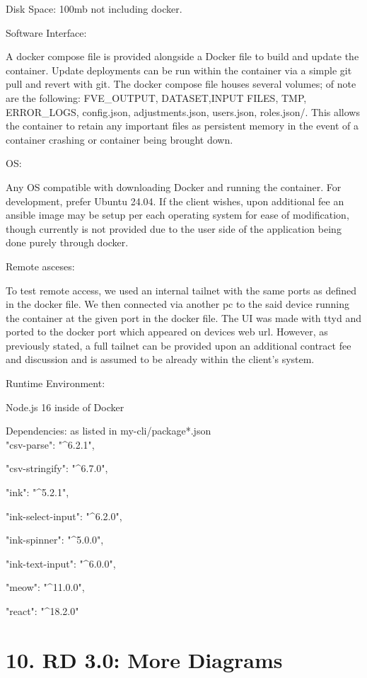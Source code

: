 \documentclass[
]{article}
\begin{document}
Disk Space: 100mb not including docker.

Software Interface:

A docker compose file is provided alongside a Docker file to build and
update the container. Update deployments can be run within the container
via a simple git pull and revert with git. The docker compose file
houses several volumes; of note are the following: FVE\_OUTPUT,
DATASET,INPUT FILES, TMP, ERROR\_LOGS, config.json, adjustments.json,
users.json, roles.json/. This allows the container to retain any
important files as persistent memory in the event of a container
crashing or container being brought down.

OS:

Any OS compatible with downloading Docker and running the container. For
development, prefer Ubuntu 24.04. If the client wishes, upon additional
fee an ansible image may be setup per each operating system for ease of
modification, though currently is not provided due to the user side of
the application being done purely through docker.

Remote asceses:

To test remote access, we used an internal tailnet with the same ports
as defined in the docker file. We then connected via another pc to the
said device running the container at the given port in the docker file.
The UI was made with ttyd and ported to the docker port which appeared
on devices web url. However, as previously stated, a full tailnet can be
provided upon an additional contract fee and discussion and is assumed
to be already within the client's system.

Runtime Environment:

Node.js 16 inside of Docker

Dependencies: as listed in my-cli/package*.json\\
"csv-parse": "\^{}6.2.1",

"csv-stringify": "\^{}6.7.0",

"ink": "\^{}5.2.1",

"ink-select-input": "\^{}6.2.0",

"ink-spinner": "\^{}5.0.0",

"ink-text-input": "\^{}6.0.0",

"meow": "\^{}11.0.0",

"react": "\^{}18.2.0"

 {}\section{10. RD 3.0: More Diagrams}\label{rd-3.0-more-diagrams}
\end{document}
